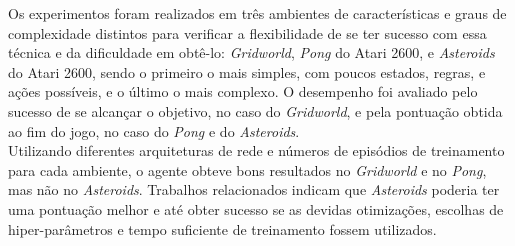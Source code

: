Os experimentos foram realizados em três ambientes de características e graus de complexidade distintos para verificar a flexibilidade de se ter sucesso com essa técnica e da dificuldade em obtê-lo: \textit{Gridworld}, \textit{Pong} do Atari 2600, e \textit{Asteroids} do Atari 2600, sendo o primeiro o mais simples, com poucos estados, regras, e ações possíveis, e o último o mais complexo.
O desempenho foi avaliado pelo sucesso de se alcançar o objetivo, no caso do \textit{Gridworld}, e pela pontuação obtida ao fim do jogo, no caso do \textit{Pong} e do \textit{Asteroids}.
\\

Utilizando diferentes arquiteturas de rede e números de episódios de treinamento para cada ambiente, o agente obteve bons resultados no \textit{Gridworld} e no \textit{Pong}, mas não no \textit{Asteroids}.
Trabalhos relacionados indicam que \textit{Asteroids} poderia ter uma pontuação melhor e até obter sucesso se as devidas otimizações, escolhas de hiper-parâmetros e tempo suficiente de treinamento fossem utilizados.
\\




